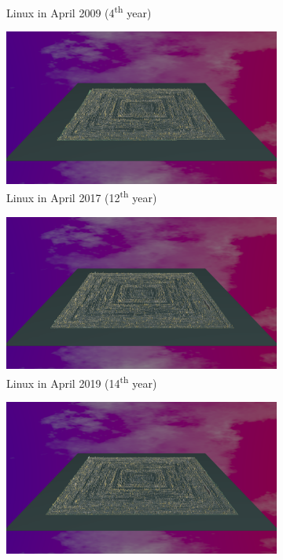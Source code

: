 \begin{figure}[ht]
\begin{subfigure}{0.48\textwidth}
        \caption{Linux in April 2009 (4\textsuperscript{th} year)} 
        \label{fig:Linux_V7_S2}
    \end{subfigure}
    \medskip
    \begin{subfigure}{0.48\textwidth}
        \includegraphics[width=\linewidth]{Linux/Animation012.png}
        \caption{Linux in April 2017 (12\textsuperscript{th} year)} 
        \label{fig:Linux_V7_S3}
    \end{subfigure}\hspace*{\fill}
    \begin{subfigure}{0.48\textwidth}
        \includegraphics[width=\linewidth]{Linux/Animation014.png}
        \caption{Linux in April 2019  (14\textsuperscript{th} year)} 
        \label{fig:Linux_V7_S4}
    \end{subfigure}
    \medskip
    \begin{subfigure}{0.48\textwidth}
        \includegraphics[width=\linewidth]{Linux/Animation015.png}

\end{subfigure}
\end{figure}
